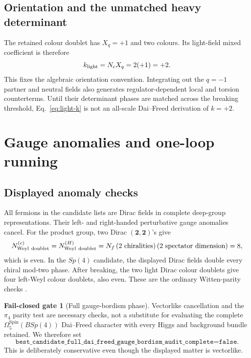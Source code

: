 \documentclass[11pt]{article}
\theoremstyle{definition}
\newtheorem{gate}[theorem]{Fail-closed gate}
\theoremstyle{remark}
\begin{document}
\subsection{Orientation and the unmatched heavy determinant}

The retained colour doublet has \(X_q=+1\) and two colours.  Its light-field
mixed coefficient is therefore
\begin{equation}
 k_{\rm light}=N_cX_q=2(+1)=+2.
 \label{eq:light-k}
\end{equation}
This fixes the algebraic orientation convention.  Integrating out the
\(q=-1\) partner and neutral fields also generates regulator-dependent local
and torsion counterterms.  Until their determinant phases are matched across
the breaking threshold, Eq.~\eqref{eq:light-k} is not an all-scale
Dai--Freed derivation of \(k=+2\).

\section{Gauge anomalies and one-loop running}

\subsection{Displayed anomaly checks}

All fermions in the candidate lists are Dirac fields in complete deep-group
representations.  Their left- and right-handed perturbative gauge anomalies
cancel.  For the product group, two Dirac \((\bm2,\bm2)\)'s give
\begin{equation}
 N^{(c)}_{\rm Weyl\ doublet}
 =N^{(H)}_{\rm Weyl\ doublet}
 =N_f\,(2\ {\rm chiralities})\,(2\ {\rm spectator\ dimension})=8,
 \label{eq:product-witten}
\end{equation}
which is even.  In the \(Sp(4)\) candidate, the displayed Dirac fields double
every chiral mod-two phase.  After breaking, the two light Dirac colour
doublets give four left-Weyl colour doublets, also even.  These are the
ordinary Witten-parity checks \cite{Witten1982,JiaYi2024}.

\begin{gate}[Full gauge-bordism phase]
Vectorlike cancellation and the \(\pi_4\) parity test are necessary checks,
not a substitute for evaluating the complete
\(\Omega_5^{\mathrm{Spin}}(BSp(4))\) Dai--Freed character with every Higgs and
background bundle retained.  We therefore set
\begin{equation}
 \texttt{best\_candidate\_full\_dai\_freed\_gauge\_bordism\_audit\_complete=false}.
 \label{eq:gauge-bordism-open}
\end{equation}
This is deliberately conservative even though the displayed matter is
vectorlike.
\end{gate}
\end{document}
